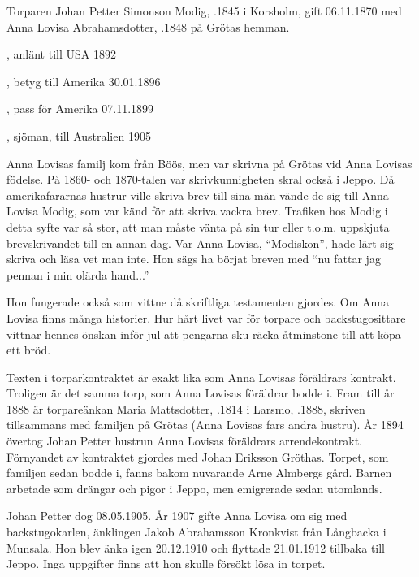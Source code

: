 
Torparen Johan Petter Simonson Modig, .1845 i Korsholm, gift 06.11.1870 med Anna Lovisa Abrahamsdotter,  .1848 på Grötas hemman.
\begin{jhchildren}
  \item {}, anlänt till USA 1892
  \item {}, betyg till Amerika 30.01.1896
  \item {}, pass för Amerika 07.11.1899
  \item {}, sjöman, till Australien 1905
\end{jhchildren}
Anna Lovisas familj kom från Böös, men var skrivna på Grötas vid Anna Lovisas födelse. På 1860- och 1870-talen var skrivkunnigheten skral också i Jeppo. Då amerikafararnas hustrur ville skriva brev till sina män vände de sig till Anna Lovisa Modig, som var känd för att skriva vackra brev. Trafiken hos Modig i detta syfte var så stor, att man måste vänta på sin tur eller t.o.m. uppskjuta brevskrivandet till en annan dag. Var Anna Lovisa, ``Modiskon'', hade lärt sig skriva och läsa vet man inte. Hon sägs ha börjat breven med ``nu fattar jag pennan i min olärda hand...''

Hon fungerade också som vittne då skriftliga testamenten gjordes. Om Anna Lovisa finns många historier. Hur hårt livet var för torpare och backstugosittare vittnar hennes önskan inför jul att pengarna sku räcka åtminstone till att köpa ett bröd.

Texten i torparkontraktet är exakt lika som Anna Lovisas föräldrars kontrakt. Troligen är det samma torp, som Anna Lovisas föräldrar bodde i. Fram till år 1888 är torpareänkan Maria Mattsdotter, .1814 i Larsmo, .1888, skriven tillsammans med familjen på Grötas (Anna Lovisas fars andra hustru). År 1894 övertog Johan Petter  hustrun Anna Lovisas föräldrars arrendekontrakt. Förnyandet av kontraktet gjordes med Johan Eriksson Gröthas. Torpet, som familjen sedan bodde i, fanns bakom nuvarande Arne Almbergs gård. Barnen arbetade som drängar och pigor i Jeppo, men emigrerade sedan utomlands.

Johan Petter dog 08.05.1905. År 1907 gifte Anna Lovisa om sig med backstugokarlen, änklingen Jakob Abrahamsson Kronkvist från Långbacka i Munsala. Hon blev änka igen 20.12.1910 och flyttade 21.01.1912 tillbaka till Jeppo. Inga uppgifter finns att hon skulle försökt lösa in torpet.


